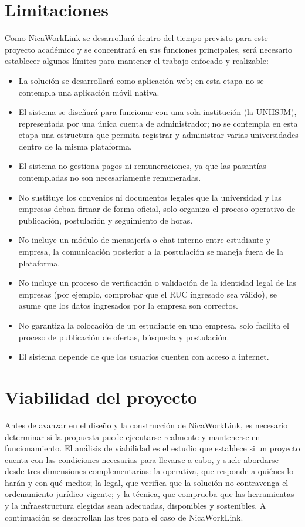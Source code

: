 \section{Limitaciones}

Como NicaWorkLink se desarrollará dentro del tiempo previsto para este proyecto académico y se concentrará en sus funciones principales, será necesario establecer algunos límites para mantener el trabajo enfocado y realizable:

\begin{itemize}
	\item La solución se desarrollará como aplicación web; en esta etapa no se contempla una aplicación móvil nativa.
	\item El sistema se diseñará para funcionar con una sola institución (la UNHSJM), representada por una única cuenta de administrador; no se contempla en esta etapa una estructura que permita registrar y administrar varias universidades dentro de la misma plataforma.
	\item El sistema no gestiona pagos ni remuneraciones, ya que las pasantías contempladas no son necesariamente remuneradas.
	\item No sustituye los convenios ni documentos legales que la universidad y las empresas deban firmar de forma oficial, solo organiza el proceso operativo de publicación, postulación y seguimiento de horas.
	\item No incluye un módulo de mensajería o chat interno entre estudiante y empresa, la comunicación posterior a la postulación se maneja fuera de la plataforma.
	\item No incluye un proceso de verificación o validación de la identidad legal de las empresas (por ejemplo, comprobar que el RUC ingresado sea válido), se asume que los datos ingresados por la empresa son correctos.
	\item No garantiza la colocación de un estudiante en una empresa, solo facilita el proceso de publicación de ofertas, búsqueda y postulación.
	\item El sistema depende de que los usuarios cuenten con acceso a internet.
\end{itemize}

\newpage

\section{Viabilidad del proyecto}

Antes de avanzar en el diseño y la construcción de NicaWorkLink, es necesario determinar si la propuesta puede ejecutarse realmente y mantenerse en funcionamiento. El análisis de viabilidad es el estudio que establece si un proyecto cuenta con las condiciones necesarias para llevarse a cabo, y suele abordarse desde tres dimensiones complementarias: la operativa, que responde a quiénes lo harán y con qué medios; la legal, que verifica que la solución no contravenga el ordenamiento jurídico vigente; y la técnica, que comprueba que las herramientas y la infraestructura elegidas sean adecuadas, disponibles y sostenibles. A continuación se desarrollan las tres para el caso de NicaWorkLink.

